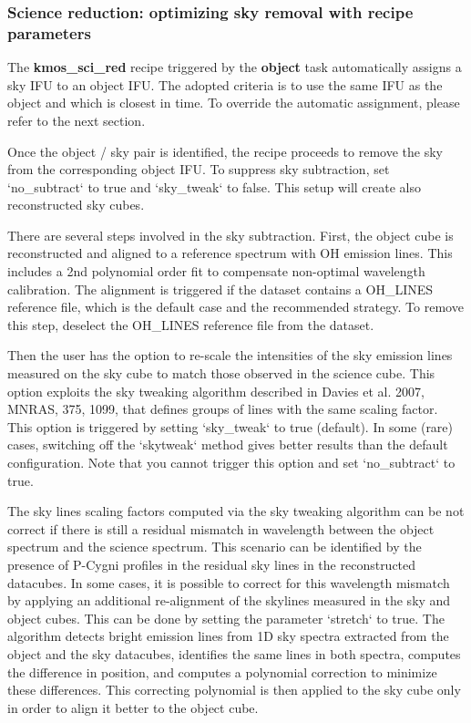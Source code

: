 \subsubsection{Science reduction: optimizing sky removal with recipe parameters}

The \textbf{kmos\_sci\_red} recipe triggered by the \textbf{object} task automatically assigns a sky IFU to an
object IFU. The adopted criteria is to use the same IFU as the object and which is closest in time. 
To override the automatic assignment, please refer to the next section.

Once the object / sky pair is identified, the recipe proceeds to remove the sky from the corresponding object
IFU. To suppress sky subtraction, set `no\_subtract` to true and `sky\_tweak` to false. This setup will
create also reconstructed sky cubes.

There are several steps involved in the sky subtraction. First, the object cube is reconstructed and aligned to a
reference spectrum with OH emission lines. This includes a 2nd polynomial order fit to compensate non-optimal
wavelength calibration. The alignment is triggered if the dataset contains a OH\_LINES reference file, which
is the default case and the recommended strategy. To remove this step, deselect the OH\_LINES reference file
from the dataset.

Then the user has the option to re-scale the intensities of the sky emission lines measured on the sky cube
to match those observed in the science cube. This option exploits the sky tweaking algorithm described in
Davies et al. 2007, MNRAS, 375, 1099, that defines groups of lines with the same scaling factor. This 
option is triggered by setting `sky\_tweak` to true (default). In some (rare) cases, switching off the `skytweak`
method gives better results than the default configuration. Note that you cannot trigger this option and set
`no\_subtract` to true.

The sky lines scaling factors computed via the sky tweaking algorithm can be not correct if there is still a residual
mismatch in wavelength between the object spectrum and the science spectrum. This scenario can be identified
by the presence of P-Cygni profiles in the residual sky lines in the reconstructed datacubes. In some cases,
it is possible to correct for this wavelength mismatch by applying an additional re-alignment of the skylines
measured in the sky and object cubes. This can be done by setting the parameter `stretch` to true.
The algorithm detects bright emission lines from 1D sky spectra extracted from the object and the sky datacubes,
identifies the same lines in both spectra, computes the difference in position, and computes a polynomial 
correction to minimize these differences. This correcting polynomial is then applied to the sky cube only in order
to align it better to the object cube.

